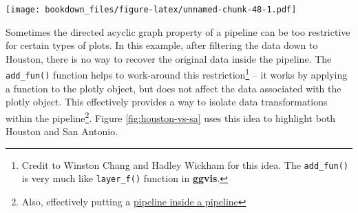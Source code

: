 \documentclass[12pt,]{isuthesis}
\newenvironment{Shaded}{\begin{snugshade}}{\end{snugshade}}
\newcommand{\KeywordTok}[1]{\textcolor[rgb]{0.13,0.29,0.53}{\textbf{{#1}}}}
\newcommand{\DataTypeTok}[1]{\textcolor[rgb]{0.13,0.29,0.53}{{#1}}}
\newcommand{\FloatTok}[1]{\textcolor[rgb]{0.00,0.00,0.81}{{#1}}}
\newcommand{\StringTok}[1]{\textcolor[rgb]{0.31,0.60,0.02}{{#1}}}
\newcommand{\NormalTok}[1]{{#1}}
\let\rmarkdownfootnote\footnote%
\def\footnote{\protect\rmarkdownfootnote}
\begin{document}
\begin{Shaded}
\end{Shaded}

\texttt{[image: bookdown\_files/figure-latex/unnamed-chunk-48-1.pdf]}

Sometimes the directed acyclic graph property of a pipeline can be too
restrictive for certain types of plots. In this example, after filtering
the data down to Houston, there is no way to recover the original data
inside the pipeline. The \texttt{add\_fun()} function helps to
work-around this restriction\footnote{Credit to Winston Chang and Hadley
  Wickham for this idea. The \texttt{add\_fun()} is very much like
  \texttt{layer\_f()} function in \textbf{ggvis}.} -- it works by
applying a function to the plotly object, but does not affect the data
associated with the plotly object. This effectively provides a way to
isolate data transformations within the pipeline\footnote{Also,
  effectively putting a
  \href{http://www.memecreator.org/meme/yo-dawg-i-heard-u-like-pipelines-so-we-put-a-pipeline-in-your-pipeline}{pipeline
  inside a pipeline}}. Figure \ref{fig:houston-vs-sa} uses this idea to
highlight both Houston and San Antonio.

\begin{Shaded}
\end{Shaded}
\end{document}
